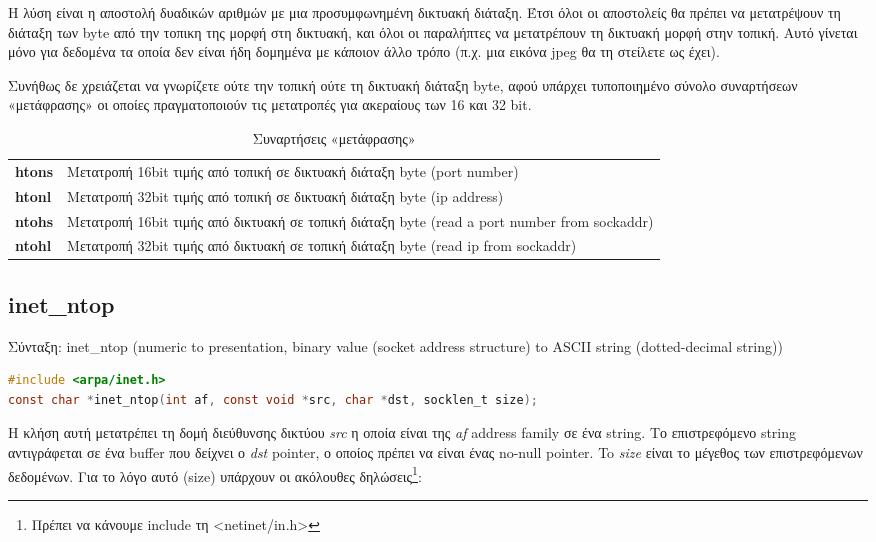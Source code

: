 Η λύση είναι η αποστολή δυαδικών αριθμών με μια προσυμφωνημένη δικτυακή διάταξη. Έτσι όλοι οι αποστολείς θα πρέπει να μετατρέψουν τη
διάταξη των byte από την τοπικη της μορφή στη δικτυακή, και όλοι οι παραλήπτες να μετατρέπουν τη δικτυακή μορφή στην τοπική. Αυτό γίνεται
μόνο για δεδομένα τα οποία δεν είναι ήδη δομημένα με κάποιον άλλο τρόπο (π.χ. μια εικόνα jpeg θα τη στείλετε ως έχει).

Συνήθως δε χρειάζεται να γνωρίζετε ούτε την τοπική ούτε τη δικτυακή διάταξη byte, αφού υπάρχει τυποποιημένο σύνολο συναρτήσεων «μετάφρασης»
οι οποίες πραγματοποιούν τις μετατροπές για ακεραίους των 16 και 32 bit. 


\begin{table}[h]
	\begin{tabularx}{\columnwidth}{l|X}
		\textbf{htons} & Μετατροπή 16bit τιμής από τοπική σε δικτυακή διάταξη byte (port number) \\
		\textbf{htonl} & Μετατροπή 32bit τιμής από τοπική σε δικτυακή διάταξη byte (ip address) \\
		\textbf{ntohs} & Μετατροπή 16bit τιμής από δικτυακή σε τοπική διάταξη byte (read a port number from sockaddr)\\
		\textbf{ntohl} & Μετατροπή 32bit τιμής από δικτυακή σε τοπική διάταξη byte  (read ip from sockaddr) \\
	\end{tabularx}  
	\caption{Συναρτήσεις «μετάφρασης»}
\end{table}



\subsection*{inet\_ntop}

Σύνταξη: inet\_ntop (numeric to presentation, binary value (socket address structure) to ASCII string (dotted-decimal string))
\begin{lstlisting}[language=C,breaklines=true, basicstyle=\scriptsize\ttfamily]
#include <arpa/inet.h>
const char *inet_ntop(int af, const void *src, char *dst, socklen_t size);
\end{lstlisting}

Η κλήση αυτή μετατρέπει τη δομή διεύθυνσης δικτύου \emph{src} η οποία είναι της \emph{af} address family σε ένα string. 
Το επιστρεφόμενο string αντιγράφεται σε ένα buffer που δείχνει ο \emph{dst} pointer, ο οποίος πρέπει να είναι ένας no-null pointer.
To \emph{size} είναι το μέγεθος των επιστρεφόμενων δεδομένων. Για το λόγο αυτό (size) υπάρχουν οι ακόλουθες δηλώσεις\footnote{Πρέπει να κάνουμε include τη <netinet/in.h>}:


